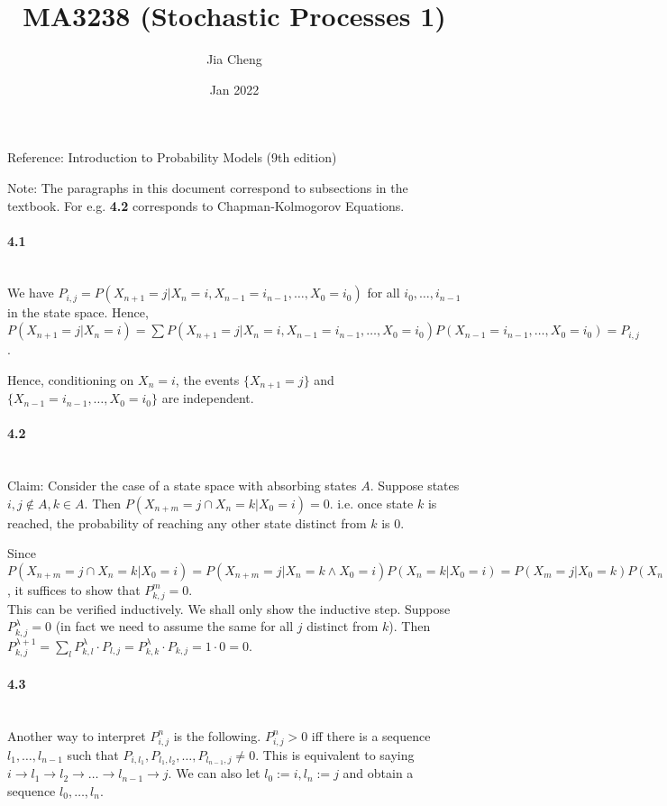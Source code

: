 \documentclass[a4paper]{article}
\title{MA3238 (Stochastic Processes 1)}
\author{Jia Cheng}
\date{Jan 2022}
\begin{document}
\maketitle

Reference: Introduction to Probability Models (9th edition)

Note: The paragraphs in this document correspond to subsections in the textbook. For e.g. \textbf{4.2} corresponds to Chapman-Kolmogorov Equations.

\paragraph{4.1}\mbox{}\\
We have $P_{i,j} = P(X_{n+1} = j | X_n = i, X_{n-1} = i_{n-1},\dots,X_0=i_0)$ for all $i_0,\dots,i_{n-1}$ in the state space. Hence, $P(X_{n+1}=j|X_n=i)=\sum P(X_{n+1} = j | X_n = i, X_{n-1} = i_{n-1},\dots,X_0=i_0)P(X_{n-1}=i_{n-1},\dots,X_0=i_0) = P_{i,j}$.

Hence, conditioning on $X_n=i$, the events $\{X_{n+1}=j\}$ and $\{X_{n-1}=i_{n-1},\dots,X_0=i_0\}$ are independent.

\paragraph{4.2}\mbox{}\\
Claim: Consider the case of a state space with absorbing states $A$. Suppose states $i,j\notin A, k\in A$. Then $P(X_{n+m} = j\cap X_{n}=k | X_0 = i) = 0$. i.e. once state $k$ is reached, the probability of reaching any other state distinct from $k$ is $0$.

Since $P(X_{n+m} = j\cap X_n = k | X_0 = i) = P(X_{n+m}=j|X_n=k\land X_0=i)P(X_n=k|X_0=i)=P(X_m=j|X_0=k)P(X_n=k|X_0=i)$, it suffices to show that $P_{k,j}^m = 0$.\\
This can be verified inductively. We shall only show the inductive step. Suppose $P_{k,j}^\lambda = 0$ (in fact we need to assume the same for all $j$ distinct from $k$). Then $P_{k,j}^{\lambda+1} = \sum_{l}P_{k,l}^\lambda\cdot P_{l,j} = P_{k,k}^\lambda\cdot P_{k,j} = 1\cdot 0=0$.

\paragraph{4.3}\mbox{}\\
Another way to interpret $P_{i,j}^n$ is the following. $P_{i,j}^n > 0$ iff there is a sequence $l_1,\dots,l_{n-1}$ such that $P_{i,l_1},P_{l_1,l_2},\dots,P_{l_{n-1},j}\neq 0$. This is equivalent to saying $i\rightarrow l_1\rightarrow l_2\rightarrow\dots\rightarrow l_{n-1}\rightarrow j$. We can also let $l_0 := i, l_n := j$ and obtain a sequence $l_0,\dots,l_n$.
\end{document}
